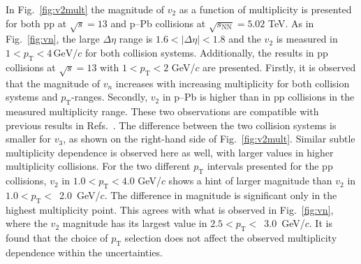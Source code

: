 In Fig.~\ref{fig:v2mult} the magnitude of $v_2$ as a function of multiplicity is presented for both pp at $\sqrt{s}=13$ and p--Pb collisions at $\sqrt{s_\mathrm{NN}}=5.02$ TeV. As in Fig.~\ref{fig:vn}, the large $\Delta\eta$ range is $1.6<|\Delta\eta|<1.8$ and the $v_2$ is measured in $1<p_{\mathrm{T}}<4\,\mathrm{GeV}/c$ for both collision systems. Additionally, the results in pp collisions at $\sqrt{s}=13$ with $1<p_{\mathrm{T}}<2$ GeV/$c$ are presented. Firstly, it is observed that the magnitude of $v_n$ increases with increasing multiplicity for both collision systems and $p_\mathrm{T}$-ranges. Secondly, $v_2$ in p--Pb is higher than in pp collisions in the measured multiplicity range. These two observations are compatible with previous results in Refs.~\cite{ATLAS:2015hzw,ATLAS:2016yzd, Khachatryan:2015lva}. The difference between the two collision systems is smaller for $v_3$, as shown on the right-hand side of Fig.~\ref{fig:v2mult}. Similar subtle multiplicity dependence is observed here as well, with larger values in higher multiplicity collisions.
For the two different $p_\mathrm{T}$ intervals presented for the pp collisions, $v_2$ in $1.0<p_\mathrm{T}<4.0$ GeV/$c$ shows a hint of larger magnitude than $v_2$ in $1.0<p_\mathrm{T}<$~2.0~GeV/$c$. The difference in magnitude is significant only in the highest multiplicity point. %
This agrees with what is observed in Fig.~\ref{fig:vn}, where the $v_2$ magnitude has its largest value in $2.5<p_\mathrm{T}<$~3.0~GeV/$c$. It is found that the choice of $p_\mathrm{T}$ selection does not affect the observed multiplicity dependence within the uncertainties. %


